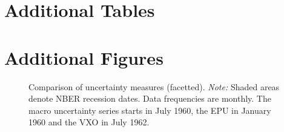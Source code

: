 \documentclass[a4paper,11pt,listof=nochaptergap,oneside,pointednumbers,bibtotoc,bigheadings,liststotoc,hidelinks]{scrbook}
\theoremstyle{mysatz}
\theoremstyle{mydefinition}
\theoremstyle{mytheorem}
\theoremstyle{mybemerkung}
\begin{document}
\section{Additional Tables}
\label{sec:additionalTables}

\section{Additional Figures}
\label{sec:additionalFigures}
\begin{figure}[!ht]
   \centering
   \setlength\fboxsep{0pt}
   \setlength\fboxrule{0pt}
      \caption[Comparison of uncertainty measures.]{Comparison of uncertainty measures (facetted).
      \textit{Note:} Shaded areas denote NBER recession dates. Data frequencies are monthly. The macro uncertainty series starts in July 1960, the EPU in January 1960 and the VXO in July 1962.}   \label{fig:comparison_plot_combined}
\end{figure}
\end{document}
